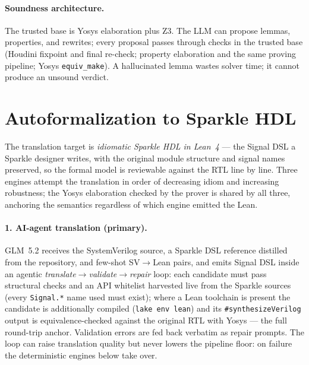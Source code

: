 \documentclass[11pt]{article}
\begin{document}
\paragraph{Soundness architecture.} The trusted base is Yosys elaboration
plus Z3. The LLM can propose lemmas, properties, and rewrites; every
proposal passes through checks in the trusted base (Houdini fixpoint and
final re-check; property elaboration and the same proving pipeline; Yosys
\texttt{equiv\_make}). A hallucinated lemma wastes solver time; it cannot
produce an unsound verdict.

\section{Autoformalization to Sparkle HDL}\label{sec:autoformal}

The translation target is \emph{idiomatic Sparkle HDL in Lean~4} --- the
Signal DSL a Sparkle designer writes, with the original module structure and
signal names preserved, so the formal model is reviewable against the RTL
line by line. Three engines attempt the translation in order of decreasing
idiom and increasing robustness; the Yosys elaboration checked by the prover
is shared by all three, anchoring the semantics regardless of which engine
emitted the Lean.

\paragraph{1. AI-agent translation (primary).} GLM~5.2 receives the
SystemVerilog source, a Sparkle DSL reference distilled from the repository,
and few-shot SV$\to$Lean pairs, and emits Signal DSL inside an agentic
\emph{translate$\to$validate$\to$repair} loop: each candidate must pass
structural checks and an API whitelist harvested live from the Sparkle
sources (every \texttt{Signal.*} name used must exist); where a Lean
toolchain is present the candidate is additionally compiled
(\texttt{lake env lean}) and its \texttt{\#synthesizeVerilog} output is
equivalence-checked against the original RTL with Yosys --- the full
round-trip anchor. Validation errors are fed back verbatim as repair
prompts. The loop can raise translation quality but never lowers the
pipeline floor: on failure the deterministic engines below take over.
\end{document}
